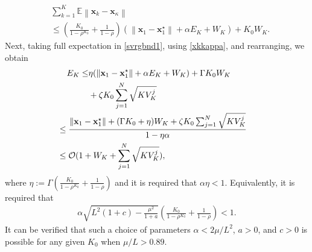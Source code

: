 \documentclass[draftcls,onecolumn,12pt]{IEEEtran}
\theoremstyle{plain}
\def\x{\mathbf{x}}
\def\EE{\mathbb{E}}
\providecommand{\norm}[1]{\left\|#1\right\|}
\theoremstyle{plain}
\theoremstyle{remark}
\begin{document}
\begin{align}
&\sum_{k=1}^K\EE\norm{\x_{k}-\x_{\kappa}}\label{xkkappa}\\
&\leq (\frac{K_0}{1-\rho^{K_0}} + \frac{1}{1-\rho})(\norm{\x_1-\x_1^\star}+\alpha E_K + W_K) + K_0W_K.  \nonumber
\end{align}
Next, taking full expectation in \eqref{svrgbnd1}, using \eqref{xkkappa}, and rearranging, we obtain
\begin{align}
E_K \leq &\eta (\norm{\x_1-\x_1^\star}+\alpha E_K + W_K) + \Gamma K_0W_K \nonumber\\
& +\zeta K_0\sum_{j=1}^N\sqrt{KV_K^j} \\
&\hspace{-1.3cm} \leq \frac{\norm{\x_1-\x_1^\star} + (\Gamma K_0+\eta)W_K + \zeta K_0\sum_{j=1}^N\sqrt{KV_K^j}}{1-\eta\alpha}\\
&\hspace{-1.3cm}\leq \mathcal{O}(1+ W_K + \sum_{j=1}^N\sqrt{KV_K^j}),
\end{align}
where $\eta := \Gamma (\frac{K_0}{1-\rho^{K_0}} + \frac{1}{1-\rho})$ and it is required that $\alpha\eta < 1$. Equivalently, it is required that 
\begin{align}
\alpha\sqrt{L^2(1+c)-\tfrac{\mu^2}{1+a}}\left(\frac{K_0}{1-\rho^{K_0}} + \frac{1}{1-\rho}\right) < 1.
\end{align}
It can be verified that such a choice of parameters $\alpha < 2\mu/L^2$,  $a > 0$, and $c > 0$ is possible for any given $K_0$ when $\mu/L > 0.89$. 
\end{document}
